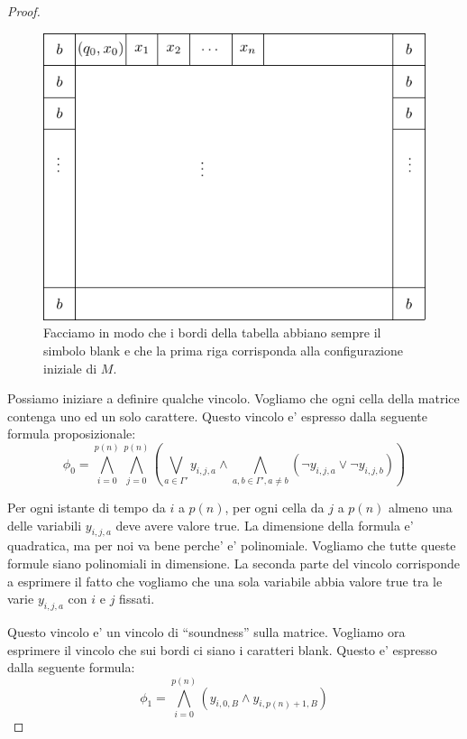 \begin{proof}
    \begin{figure}[h]
        \begin{center}
            \includegraphics{./img/NPClass/SATproof2.pdf}
            \caption{Facciamo in modo che i bordi della tabella abbiano sempre il simbolo blank e
            che la prima riga corrisponda alla configurazione iniziale di $M$.}
        \end{center}
    \end{figure}


    Possiamo iniziare a definire qualche vincolo. Vogliamo che ogni cella della matrice contenga uno ed
    un solo carattere. Questo vincolo e' espresso dalla seguente formula proposizionale:
    \begin{equation*}
        \phi_{0} = \bigwedge_{i=0}^{p(n)}\bigwedge_{j=0}^{p(n)}\left(\bigvee_{a \in \Gamma'}
            y_{i,j,a}
        \land \bigwedge_{a,b \in \Gamma',a \not= b}(\lnot y_{i,j,a} \lor \lnot y_{i,j,b})\right)
    \end{equation*}
    
    Per ogni istante di tempo da $i$ a $p(n)$, per ogni cella da $j$ a $p(n)$ almeno una delle
    variabili $y_{i,j,a}$ deve avere valore true. La dimensione della formula e' quadratica, ma per
    noi va bene perche' e' polinomiale. Vogliamo che tutte queste formule siano polinomiali in
    dimensione. La seconda parte del vincolo corrisponde a esprimere il fatto che vogliamo che una
    sola variabile abbia valore true tra le varie $y_{i,j,a}$ con $i$ e $j$ fissati.

    Questo vincolo e' un vincolo di ``soundness'' sulla matrice. Vogliamo ora esprimere il vincolo che
    sui bordi ci siano i caratteri blank. Questo e' espresso dalla seguente formula:
    \begin{equation*}
        \phi_{1} = \bigwedge_{i=0}^{p(n)}(y_{i,0,B} \land y_{i,p(n)+1,B})
    \end{equation*}


\end{proof}
